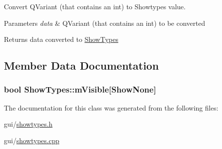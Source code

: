 Convert Q\-Variant (that contains an int) to Showtypes value. 


\begin{DoxyParams}{Parameters}
{\em data} & Q\-Variant (that contains an int) to be converted \\
\hline
\end{DoxyParams}
\begin{DoxyReturn}{Returns}
data converted to \hyperlink{class_show_types}{Show\-Types} 
\end{DoxyReturn}


\subsection{Member Data Documentation}
\hypertarget{class_show_types_a3e2bef2e4f0394d451ec638070fb73cd}{
\subsubsection[{m\-Visible}]{\setlength{\rightskip}{0pt plus 5cm}bool Show\-Types\-::m\-Visible\mbox{[}{\bf Show\-None}\mbox{]}}}\label{class_show_types_a3e2bef2e4f0394d451ec638070fb73cd}


The documentation for this class was generated from the following files\-:\begin{DoxyCompactItemize}
\item 
gui/\hyperlink{showtypes_8h}{showtypes.\-h}\item 
gui/\hyperlink{showtypes_8cpp}{showtypes.\-cpp}\end{DoxyCompactItemize}
